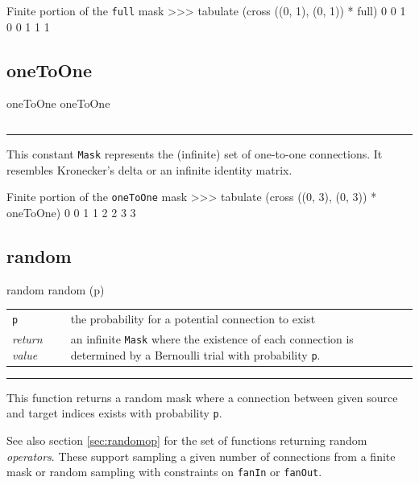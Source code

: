 \documentclass[a4paper,twoside]{report}
\makeatletter
\newenvironment{parameters}%
{\begin{tabular}{@{\hspace{2em}}lp{0.6\textwidth}}}%
{\end{tabular}\par\vspace{1mm}\par\hrule\par\vspace{5mm}}
\newcommand{\cls}[1]{\lstinline|#1|}
\newcommand{\fa}[1]{\lstinline|#1|}
\newcommand{\expr}[1]{\lstinline|#1|}
\newcommand{\ret}{\emph{return value}}
\makeatother
\begin{document}
\begin{code}{Finite portion of the \expr{full} mask}
>>> tabulate (cross ((0, 1), (0, 1)) * full)
0 	0
1 	0
0 	1
1 	1
\end{code}

\subsection{oneToOne}
\begin{head}{oneToOne}
  oneToOne
\end{head}
\begin{parameters}
\end{parameters}
This constant \cls{Mask} represents the (infinite) set of one-to-one
connections.  It resembles Kronecker's delta or an infinite identity
matrix.

\begin{code}{Finite portion of the \expr{oneToOne} mask}
>>> tabulate (cross ((0, 3), (0, 3)) * oneToOne)
0 	0
1 	1
2 	2
3 	3
\end{code}

\subsection{random}
\begin{head}{random}
  random (p)
\end{head}
\begin{parameters}
  \lstinline|p| &%
  the probability for a potential connection to exist\\
  \ret &%
  an infinite \cls{Mask} where the existence of each connection is
  determined by a Bernoulli trial with probability \fa{p}.\\
\end{parameters}
This function returns a random mask where a connection between given
source and target indices exists with probability \fa{p}.

See also section \ref{sec:randomop} for the set of functions returning
random \emph{operators}.  These support sampling a given number of
connections from a finite mask or random sampling with constraints on
\fa{fanIn} or \fa{fanOut}.
\end{document}
